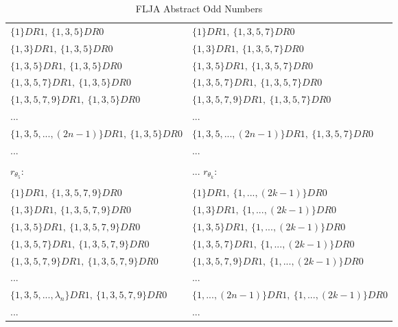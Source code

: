 \begin{table}[h!]
\begin{center}
\begin{tabular}{|l||l|}
				\hline
				\hline
					$\{1\}DR1,\:\{1, 3, 5\}DR0$ &
					$\{1\}DR1,\:\{1, 3, 5, 7\}DR0$ \\
					$\{1, 3\}DR1,\:\{1, 3, 5\}DR0$ &
					$\{1, 3\}DR1,\:\{1, 3, 5, 7\}DR0$ \\
					$\{1, 3, 5\}DR1,\:\{1, 3, 5\}DR0$ &
					$\{1, 3, 5\}DR1,\:\{1, 3, 5, 7\}DR0$ \\
					$\{1, 3, 5, 7\}DR1,\:\{1, 3, 5\}DR0$ &
					$\{1, 3, 5, 7\}DR1,\:\{1, 3, 5, 7\}DR0$ \\
					$\{1, 3, 5, 7, 9\}DR1,\:\{1, 3, 5\}DR0$ &
					$\{1, 3, 5, 7, 9\}DR1,\:\{1, 3, 5, 7\}DR0$ \\
					... & ... \\
					$\{1, 3, 5, ... , (2n-1)\}DR1,\:\{1, 3, 5\}DR0$ &
					$\{1, 3, 5, ... , (2n-1)\}DR1,\:\{1, 3, 5, 7\}DR0$ \\
					... & ... \\				
				\hline
				\hline
					\cellcolor{bosunired!50} & \cellcolor{bosunired!50}  \\
					\cellcolor{bosunired!50} {\LARGE $r_{\theta_{5}}$:  } & \cellcolor{bosunired!50}... {\LARGE $r_{\theta_{k}}$:  } \\
					\cellcolor{bosunired!50} & \cellcolor{bosunired!50}  \\
				\hline
				\hline
					$\{1\}DR1,\:\{1, 3, 5, 7, 9\}DR0$ &
					$\{1\}DR1,\:\{1, ... , (2k-1)\}DR0$ \\
					$\{1, 3\}DR1,\:\{1, 3, 5, 7, 9\}DR0$ &
					$\{1, 3\}DR1,\:\{1, ... , (2k-1)\}DR0$ \\
					$\{1, 3, 5\}DR1,\:\{1, 3, 5, 7, 9\}DR0$ &
					$\{1, 3, 5\}DR1,\:\{1, ... , (2k-1)\}DR0$ \\
					$\{1, 3, 5, 7\}DR1,\:\{1, 3, 5, 7, 9\}DR0$ &
					$\{1, 3, 5, 7\}DR1,\:\{1, ... , (2k-1)\}DR0$ \\
					$\{1, 3, 5, 7, 9\}DR1,\:\{1, 3, 5, 7, 9\}DR0$ &
					$\{1, 3, 5, 7, 9\}DR1,\:\{1, ... , (2k-1)\}DR0$ \\
				... & ... \\
					$\{1, 3, 5, ... , \lambda_{n}\}DR1,\:\{1, 3, 5, 7, 9\}DR0$ &
					$\{1, ... , (2n-1)\}DR1,\:\{1, ... , (2k-1)\}DR0$ \\
				... & ... \\
				\hline
			\end{tabular}
			\caption{FLJA Abstract Odd Numbers}
			\label{tab:flja_snei_odds}
		\end{center}
	\end{table}

